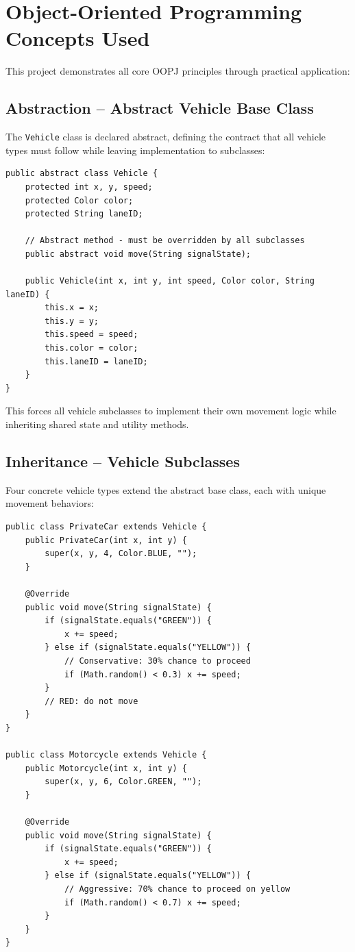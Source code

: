 \documentclass[12pt,a4paper]{article}
\begin{document}
\newpage
\section{Object-Oriented Programming Concepts Used}

This project demonstrates all core OOPJ principles through practical application:

\subsection{Abstraction – Abstract Vehicle Base Class}
The \texttt{Vehicle} class is declared abstract, defining the contract that all vehicle types must follow while leaving implementation to subclasses:

\begin{lstlisting}
public abstract class Vehicle {
    protected int x, y, speed;
    protected Color color;
    protected String laneID;
    
    // Abstract method - must be overridden by all subclasses
    public abstract void move(String signalState);
    
    public Vehicle(int x, int y, int speed, Color color, String laneID) {
        this.x = x;
        this.y = y;
        this.speed = speed;
        this.color = color;
        this.laneID = laneID;
    }
}
\end{lstlisting}

This forces all vehicle subclasses to implement their own movement logic while inheriting shared state and utility methods.

\subsection{Inheritance – Vehicle Subclasses}
Four concrete vehicle types extend the abstract base class, each with unique movement behaviors:

\begin{lstlisting}
public class PrivateCar extends Vehicle {
    public PrivateCar(int x, int y) {
        super(x, y, 4, Color.BLUE, "");
    }
    
    @Override
    public void move(String signalState) {
        if (signalState.equals("GREEN")) {
            x += speed;
        } else if (signalState.equals("YELLOW")) {
            // Conservative: 30% chance to proceed
            if (Math.random() < 0.3) x += speed;
        }
        // RED: do not move
    }
}

public class Motorcycle extends Vehicle {
    public Motorcycle(int x, int y) {
        super(x, y, 6, Color.GREEN, "");
    }
    
    @Override
    public void move(String signalState) {
        if (signalState.equals("GREEN")) {
            x += speed;
        } else if (signalState.equals("YELLOW")) {
            // Aggressive: 70% chance to proceed on yellow
            if (Math.random() < 0.7) x += speed;
        }
    }
}
\end{lstlisting}
\end{document}
